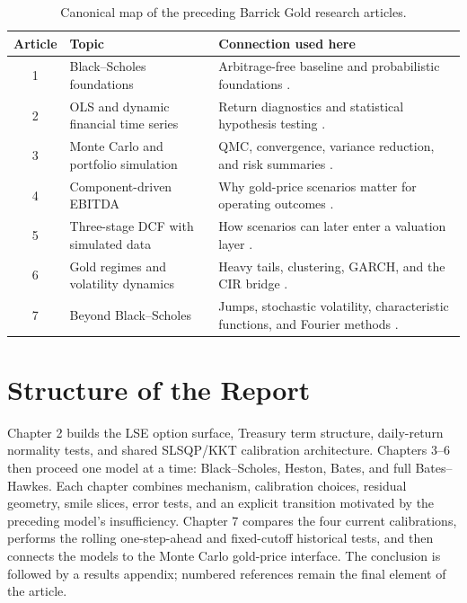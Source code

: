 \documentclass[a4paper,10pt,titlepage,oneside,openany]{book}
\theoremstyle{plain}
\theoremstyle{definition}
\theoremstyle{remark}
\begin{document}
\begin{table}[H]
\centering
\footnotesize
\setlength{\tabcolsep}{3pt}
\begin{tabularx}{\textwidth}{@{}c>{\RaggedRight\arraybackslash}p{4.2cm}>{\RaggedRight\arraybackslash}X@{}}
\toprule
\textbf{Article} & \textbf{Topic} & \textbf{Connection used here} \\
\midrule
1 & Black--Scholes foundations & Arbitrage-free baseline and probabilistic foundations \cite{BarrickArticle1}. \\
2 & OLS and dynamic financial time series & Return diagnostics and statistical hypothesis testing \cite{BarrickArticle2}. \\
3 & Monte Carlo and portfolio simulation & QMC, convergence, variance reduction, and risk summaries \cite{BarrickArticle3}. \\
4 & Component-driven EBITDA & Why gold-price scenarios matter for operating outcomes \cite{BarrickArticle4}. \\
5 & Three-stage DCF with simulated data & How scenarios can later enter a valuation layer \cite{BarrickArticle5}. \\
6 & Gold regimes and volatility dynamics & Heavy tails, clustering, GARCH, and the CIR bridge \cite{BarrickArticle6}. \\
7 & Beyond Black--Scholes & Jumps, stochastic volatility, characteristic functions, and Fourier methods \cite{BarrickArticle7}. \\
\bottomrule
\end{tabularx}
\caption{Canonical map of the preceding Barrick Gold research articles.}
\label{tab:prior-articles}
\end{table}

\section{Structure of the Report}

Chapter 2 builds the LSE option surface, Treasury term structure, daily-return normality tests, and shared SLSQP/KKT calibration architecture. Chapters 3--6 then proceed one model at a time: Black--Scholes, Heston, Bates, and full Bates--Hawkes. Each chapter combines mechanism, calibration choices, residual geometry, smile slices, error tests, and an explicit transition motivated by the preceding model's insufficiency. Chapter 7 compares the four current calibrations, performs the rolling one-step-ahead and fixed-cutoff historical tests, and then connects the models to the Monte Carlo gold-price interface. The conclusion is followed by a results appendix; numbered references remain the final element of the article.
\end{document}
